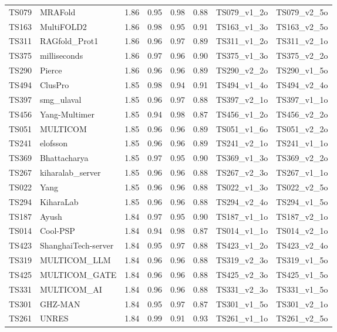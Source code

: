 \begin{table}[ht]
{\begin{tabular}{llllllll}
TS079 & MRAFold & 1.86 & 0.95 & 0.98 & 0.88 & TS079\_v1\_2o & TS079\_v2\_5o \\ 
TS163 & MultiFOLD2 & 1.86 & 0.98 & 0.95 & 0.91 & TS163\_v1\_3o & TS163\_v2\_5o \\ 
TS311 & RAGfold\_Prot1 & 1.86 & 0.96 & 0.97 & 0.89 & TS311\_v1\_2o & TS311\_v2\_1o \\ 
TS375 & milliseconds & 1.86 & 0.97 & 0.96 & 0.90 & TS375\_v1\_3o & TS375\_v2\_2o \\ 
TS290 & Pierce & 1.86 & 0.96 & 0.96 & 0.89 & TS290\_v2\_2o & TS290\_v1\_5o \\ 
TS494 & ClusPro & 1.85 & 0.98 & 0.94 & 0.91 & TS494\_v1\_4o & TS494\_v2\_4o \\ 
TS397 & smg\_ulaval & 1.85 & 0.96 & 0.97 & 0.88 & TS397\_v2\_1o & TS397\_v1\_1o \\ 
TS456 & Yang-Multimer & 1.85 & 0.94 & 0.98 & 0.87 & TS456\_v1\_2o & TS456\_v2\_2o \\ 
TS051 & MULTICOM & 1.85 & 0.96 & 0.96 & 0.89 & TS051\_v1\_6o & TS051\_v2\_2o \\ 
TS241 & elofsson & 1.85 & 0.96 & 0.96 & 0.89 & TS241\_v2\_1o & TS241\_v1\_1o \\ 
TS369 & Bhattacharya & 1.85 & 0.97 & 0.95 & 0.90 & TS369\_v1\_3o & TS369\_v2\_2o \\ 
TS267 & kiharalab\_server & 1.85 & 0.96 & 0.96 & 0.88 & TS267\_v2\_3o & TS267\_v1\_1o \\ 
TS022 & Yang & 1.85 & 0.96 & 0.96 & 0.88 & TS022\_v1\_3o & TS022\_v2\_5o \\ 
TS294 & KiharaLab & 1.85 & 0.96 & 0.96 & 0.88 & TS294\_v2\_4o & TS294\_v1\_5o \\ 
TS187 & Ayush & 1.84 & 0.97 & 0.95 & 0.90 & TS187\_v1\_1o & TS187\_v2\_1o \\ 
TS014 & Cool-PSP & 1.84 & 0.94 & 0.98 & 0.87 & TS014\_v1\_1o & TS014\_v2\_1o \\ 
TS423 & ShanghaiTech-server & 1.84 & 0.95 & 0.97 & 0.88 & TS423\_v1\_2o & TS423\_v2\_4o \\ 
TS319 & MULTICOM\_LLM & 1.84 & 0.96 & 0.96 & 0.88 & TS319\_v2\_3o & TS319\_v1\_5o \\ 
TS425 & MULTICOM\_GATE & 1.84 & 0.96 & 0.96 & 0.88 & TS425\_v2\_3o & TS425\_v1\_5o \\ 
TS331 & MULTICOM\_AI & 1.84 & 0.96 & 0.96 & 0.88 & TS331\_v2\_3o & TS331\_v1\_5o \\ 
TS301 & GHZ-MAN & 1.84 & 0.95 & 0.97 & 0.87 & TS301\_v1\_5o & TS301\_v2\_1o \\ 
TS261 & UNRES & 1.84 & 0.99 & 0.91 & 0.93 & TS261\_v1\_1o & TS261\_v2\_5o \\ 

\end{tabular}}
\end{table}
